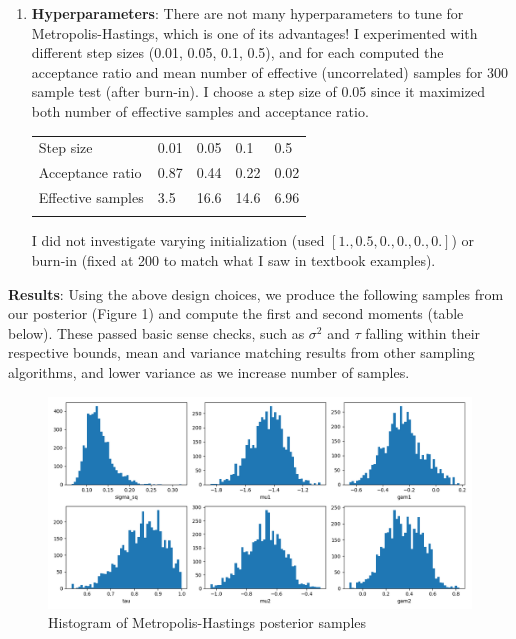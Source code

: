 \documentclass[12pt,letterpaper,twoside]{article}
\begin{document}
\begin{enumerate}[label=(\alph*)]
\item \textbf{Hyperparameters}: There are not many hyperparameters to 
tune for Metropolis-Hastings, which is one of its advantages! I 
experimented with different step sizes (0.01, 0.05, 0.1, 0.5), 
and for each computed the acceptance ratio and mean number of 
effective (uncorrelated) samples for 300 sample test (after 
burn-in). I choose a step size of 0.05 since it maximized 
both number of effective samples and acceptance ratio.

\begin{table}[H]
    \centering
    \begin{tabular}{lllll}
        Step size                   & 0.01 & 0.05  & 0.1   & 0.5   \\
        Acceptance ratio            & 0.87 & 0.44  & 0.22  & 0.02  \\
        Effective samples           & 3.5  & 16.6  & 14.6  & 6.96  \\
                                    &      &       &       &         
    \end{tabular}
\end{table}

I did not investigate varying initialization (used $[1., 0.5, 0., 0., 0., 0.]$)
or burn-in (fixed at 200 to match what I saw in textbook examples).
\end{enumerate}

\textbf{Results}: Using the above design choices, we produce the following 
samples from our posterior (Figure 1) and compute the first and second 
moments (table below). These passed basic sense checks, such as $\sigma^2$ 
and $\tau$ falling within their respective bounds, mean and variance matching 
results from other sampling algorithms, and lower variance as we increase number 
of samples.
\begin{figure}[H]
    \centering
    \includegraphics[scale=0.55]{mh_sampled_histogram.png}
    \vspace*{-10mm}
    \caption{Histogram of Metropolis-Hastings posterior samples}
\end{figure}
\end{document}
